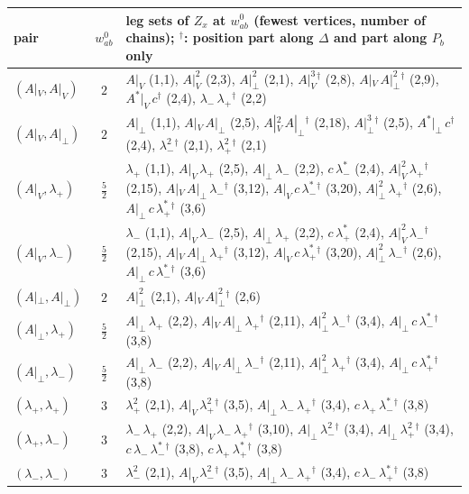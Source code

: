 \documentclass[11pt]{article}
\numberwithin{equation}{section}
\theoremstyle{plain}
\theoremstyle{definition}
\begin{document}
\begin{center}\scriptsize
\begin{tabular}{l|c|p{12.2cm}}
pair & $w^0_{ab}$ & leg sets of $Z_x$ at $w^0_{ab}$ (fewest vertices, number of chains); ${}^\dagger$: position part along $\Delta$ and part along $P_b$ only\\\hline
$(A|_V,A|_V)$ & $2$ & $A|_V$ (1,1), $A|_V^{2}$ (2,3), $A|_\perp^{2}$ (2,1), $A|_V^{3}{}^{\dagger}$ (2,8), $A|_V\,A|_\perp^{2}{}^{\dagger}$ (2,9), $A^*|_V\,c{}^{\dagger}$ (2,4), $\lambda_-\,\lambda_+{}^{\dagger}$ (2,2)\\
$(A|_V,A|_\perp)$ & $2$ & $A|_\perp$ (1,1), $A|_V\,A|_\perp$ (2,5), $A|_V^{2}\,A|_\perp{}^{\dagger}$ (2,18), $A|_\perp^{3}{}^{\dagger}$ (2,5), $A^*|_\perp\,c{}^{\dagger}$ (2,4), $\lambda_-^{2}{}^{\dagger}$ (2,1), $\lambda_+^{2}{}^{\dagger}$ (2,1)\\
$(A|_V,\lambda_+)$ & $\tfrac{5}{2}$ & $\lambda_+$ (1,1), $A|_V\,\lambda_+$ (2,5), $A|_\perp\,\lambda_-$ (2,2), $c\,\lambda^*_-$ (2,4), $A|_V^{2}\,\lambda_+{}^{\dagger}$ (2,15), $A|_V\,A|_\perp\,\lambda_-{}^{\dagger}$ (3,12), $A|_V\,c\,\lambda^*_-{}^{\dagger}$ (3,20), $A|_\perp^{2}\,\lambda_+{}^{\dagger}$ (2,6), $A|_\perp\,c\,\lambda^*_+{}^{\dagger}$ (3,6)\\
$(A|_V,\lambda_-)$ & $\tfrac{5}{2}$ & $\lambda_-$ (1,1), $A|_V\,\lambda_-$ (2,5), $A|_\perp\,\lambda_+$ (2,2), $c\,\lambda^*_+$ (2,4), $A|_V^{2}\,\lambda_-{}^{\dagger}$ (2,15), $A|_V\,A|_\perp\,\lambda_+{}^{\dagger}$ (3,12), $A|_V\,c\,\lambda^*_+{}^{\dagger}$ (3,20), $A|_\perp^{2}\,\lambda_-{}^{\dagger}$ (2,6), $A|_\perp\,c\,\lambda^*_-{}^{\dagger}$ (3,6)\\
$(A|_\perp,A|_\perp)$ & $2$ & $A|_\perp^{2}$ (2,1), $A|_V\,A|_\perp^{2}{}^{\dagger}$ (2,6)\\
$(A|_\perp,\lambda_+)$ & $\tfrac{5}{2}$ & $A|_\perp\,\lambda_+$ (2,2), $A|_V\,A|_\perp\,\lambda_+{}^{\dagger}$ (2,11), $A|_\perp^{2}\,\lambda_-{}^{\dagger}$ (3,4), $A|_\perp\,c\,\lambda^*_-{}^{\dagger}$ (3,8)\\
$(A|_\perp,\lambda_-)$ & $\tfrac{5}{2}$ & $A|_\perp\,\lambda_-$ (2,2), $A|_V\,A|_\perp\,\lambda_-{}^{\dagger}$ (2,11), $A|_\perp^{2}\,\lambda_+{}^{\dagger}$ (3,4), $A|_\perp\,c\,\lambda^*_+{}^{\dagger}$ (3,8)\\
$(\lambda_+,\lambda_+)$ & $3$ & $\lambda_+^{2}$ (2,1), $A|_V\,\lambda_+^{2}{}^{\dagger}$ (3,5), $A|_\perp\,\lambda_-\,\lambda_+{}^{\dagger}$ (3,4), $c\,\lambda_+\,\lambda^*_-{}^{\dagger}$ (3,8)\\
$(\lambda_+,\lambda_-)$ & $3$ & $\lambda_-\,\lambda_+$ (2,2), $A|_V\,\lambda_-\,\lambda_+{}^{\dagger}$ (3,10), $A|_\perp\,\lambda_-^{2}{}^{\dagger}$ (3,4), $A|_\perp\,\lambda_+^{2}{}^{\dagger}$ (3,4), $c\,\lambda_-\,\lambda^*_-{}^{\dagger}$ (3,8), $c\,\lambda_+\,\lambda^*_+{}^{\dagger}$ (3,8)\\
$(\lambda_-,\lambda_-)$ & $3$ & $\lambda_-^{2}$ (2,1), $A|_V\,\lambda_-^{2}{}^{\dagger}$ (3,5), $A|_\perp\,\lambda_-\,\lambda_+{}^{\dagger}$ (3,4), $c\,\lambda_-\,\lambda^*_+{}^{\dagger}$ (3,8)\\
\end{tabular}
\end{center}
\end{document}
